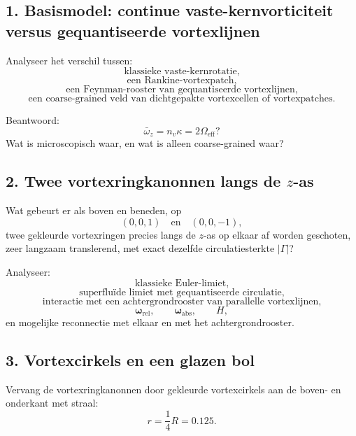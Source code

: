 \documentclass[11pt]{article}
\begin{document}
    \subsection{1. Basismodel: continue vaste-kernvorticiteit versus gequantiseerde vortexlijnen}
        
        Analyseer het verschil tussen:
        \[
            \text{klassieke vaste-kernrotatie,}
        \]
        \[
            \text{een Rankine-vortexpatch,}
        \]
        \[
            \text{een Feynman-rooster van gequantiseerde vortexlijnen,}
        \]
        \[
            \text{een coarse-grained veld van dichtgepakte vortexcellen of vortexpatches.}
        \]
        
        Beantwoord:
        \[
            \bar{\omega}_z
            =
            n_v\kappa
            =
            2\Omega_{\mathrm{eff}}?
        \]
        Wat is microscopisch waar, en wat is alleen coarse-grained waar?
    
    \subsection{2. Twee vortexringkanonnen langs de \(z\)-as}
        
        Wat gebeurt er als boven en beneden, op
        \[
            (0,0,1)
            \quad\text{en}\quad
            (0,0,-1),
        \]
        twee gekleurde vortexringen precies langs de \(z\)-as op elkaar af worden geschoten, zeer langzaam translerend, met exact dezelfde circulatiesterkte \(|\Gamma|\)?
        
        Analyseer:
        \[
            \text{klassieke Euler-limiet,}
        \]
        \[
            \text{superfluïde limiet met gequantiseerde circulatie,}
        \]
        \[
            \text{interactie met een achtergrondrooster van parallelle vortexlijnen,}
        \]
        \[
            \boldsymbol{\omega}_{\mathrm{rel}},
            \qquad
            \boldsymbol{\omega}_{\mathrm{abs}},
            \qquad
            H,
        \]
        en mogelijke reconnectie met elkaar en met het achtergrondrooster.
    
    \subsection{3. Vortexcirkels en een glazen bol}
        
        Vervang de vortexringkanonnen door gekleurde vortexcirkels aan de boven- en onderkant met straal:
        \[
            r=\frac{1}{4}R=0.125.
        \]
        
\end{document}

